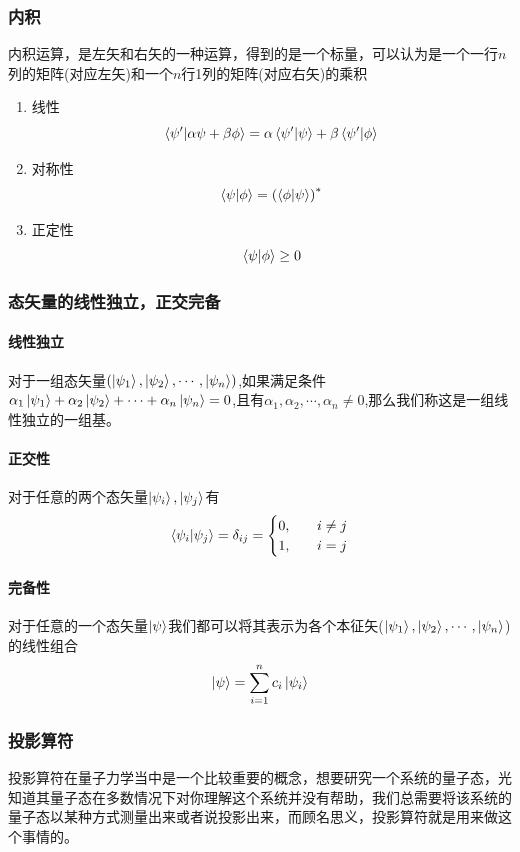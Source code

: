 \documentclass{article}
\begin{document}
\subsubsection{内积}
内积运算，是左矢和右矢的一种运算，得到的是一个标量，可以认为是一个一行$n$列的矩阵(对应左矢)和一个$n$行1列的矩阵(对应右矢)的乘积
\begin{enumerate}
	\item 线性\[\braket{\psi'}{\alpha\psi+\beta\phi}=\alpha\braket{\psi'}{\psi}+\beta\braket{\psi'}{\phi}\]
	\item 对称性\[\braket{\psi}{\phi}=\left(\braket{\phi}{\psi}\right)^*\]
	\item 正定性\[\braket{\psi}{\phi}\geq 0\]
\end{enumerate}

\subsubsection{态矢量的线性独立，正交完备}
\paragraph{线性独立}对于一组态矢量$(\ket{\psi_1},\ket{\psi_2},\cdots,\ket{\psi_n})$,如果满足条件$\alpha_1\ket{\psi_1}+\alpha_2\ket{\psi_2}+\cdots+\alpha_n\ket{\psi_n}=0$,且有$\alpha_1,\alpha_2,\cdots,\alpha_n\neq 0$,那么我们称这是一组线性独立的一组基。

\paragraph{正交性}对于任意的两个态矢量$\ket{\psi_i},\ket{\psi_j}$有
\begin{equation*}
	\braket{\psi_i}{\psi_j}=\delta_{ij}=
	\begin{cases}
		0, & \quad i\neq j \\
		1, & \quad i=j
	\end{cases}
\end{equation*}

\paragraph{完备性}对于任意的一个态矢量$\ket{\psi}$我们都可以将其表示为各个本征矢($\ket{\psi_1},\ket{\psi_2},\cdots,\ket{\psi_n}$)的线性组合
\[\ket{\psi}=\sum_{i=1}^nc_i\ket{\psi_i}\]


\subsubsection{投影算符}
投影算符在量子力学当中是一个比较重要的概念，想要研究一个系统的量子态，光知道其量子态在多数情况下对你理解这个系统并没有帮助，我们总需要将该系统的量子态以某种方式测量出来或者说投影出来，而顾名思义，投影算符就是用来做这个事情的。
\end{document}
